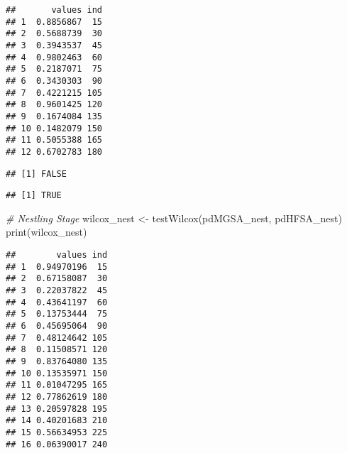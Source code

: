 \documentclass[
]{article}
\newenvironment{Shaded}{\begin{snugshade}}{\end{snugshade}}
\newcommand{\CommentTok}[1]{\textcolor[rgb]{0.56,0.35,0.01}{\textit{#1}}}
\newcommand{\FloatTok}[1]{\textcolor[rgb]{0.00,0.00,0.81}{#1}}
\newcommand{\FunctionTok}[1]{\textcolor[rgb]{0.00,0.00,0.00}{#1}}
\newcommand{\NormalTok}[1]{#1}
\newcommand{\OtherTok}[1]{\textcolor[rgb]{0.56,0.35,0.01}{#1}}
\newcommand{\SpecialCharTok}[1]{\textcolor[rgb]{0.00,0.00,0.00}{#1}}
\begin{document}
\begin{verbatim}
##       values ind
## 1  0.8856867  15
## 2  0.5688739  30
## 3  0.3943537  45
## 4  0.9802463  60
## 5  0.2187071  75
## 6  0.3430303  90
## 7  0.4221215 105
## 8  0.9601425 120
## 9  0.1674084 135
## 10 0.1482079 150
## 11 0.5055388 165
## 12 0.6702783 180
\end{verbatim}

\begin{Shaded}
\end{Shaded}

\begin{verbatim}
## [1] FALSE
\end{verbatim}

\begin{Shaded}
\end{Shaded}

\begin{verbatim}
## [1] TRUE
\end{verbatim}

\begin{Shaded}
\begin{Highlighting}[]
\CommentTok{\# Nestling Stage}
\NormalTok{wilcox\_nest }\OtherTok{\textless{}{-}} \FunctionTok{testWilcox}\NormalTok{(pdMGSA\_nest, pdHFSA\_nest)}
\FunctionTok{print}\NormalTok{(wilcox\_nest)}
\end{Highlighting}
\end{Shaded}

\begin{verbatim}
##        values ind
## 1  0.94970196  15
## 2  0.67158087  30
## 3  0.22037822  45
## 4  0.43641197  60
## 5  0.13753444  75
## 6  0.45695064  90
## 7  0.48124642 105
## 8  0.11508571 120
## 9  0.83764080 135
## 10 0.13535971 150
## 11 0.01047295 165
## 12 0.77862619 180
## 13 0.20597828 195
## 14 0.40201683 210
## 15 0.56634953 225
## 16 0.06390017 240
\end{verbatim}
\end{document}
